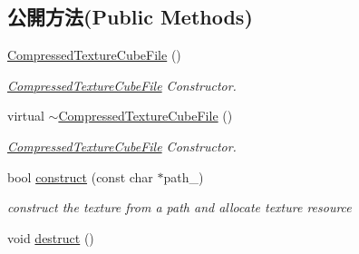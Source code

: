\subsection*{公開方法(Public Methods)}
\begin{DoxyCompactItemize}
\item 
\hyperlink{class_i_dream_sky_1_1_compressed_texture_cube_file_aefa8787aee90468e901fe19a87ae568f}{Compressed\+Texture\+Cube\+File} ()
\begin{DoxyCompactList}\small\item\em \hyperlink{class_i_dream_sky_1_1_compressed_texture_cube_file}{Compressed\+Texture\+Cube\+File} Constructor. \end{DoxyCompactList}\item 
virtual \hyperlink{class_i_dream_sky_1_1_compressed_texture_cube_file_a3a4c657cbe39dd8b641bd37f7d6df86e}{$\sim$\+Compressed\+Texture\+Cube\+File} ()
\begin{DoxyCompactList}\small\item\em \hyperlink{class_i_dream_sky_1_1_compressed_texture_cube_file}{Compressed\+Texture\+Cube\+File} Constructor. \end{DoxyCompactList}\item 
bool \hyperlink{class_i_dream_sky_1_1_compressed_texture_cube_file_a7c10dd1f90a4f8d057c0a194ef62cabe}{construct} (const char $\ast$path\+\_\+)
\begin{DoxyCompactList}\small\item\em construct the texture from a path and allocate texture resource \end{DoxyCompactList}\item 
void \hyperlink{class_i_dream_sky_1_1_compressed_texture_cube_file_a7a3f8f23e09fd0f8e05f2c9869db1853}{destruct} ()\hypertarget{class_i_dream_sky_1_1_compressed_texture_cube_file_a7a3f8f23e09fd0f8e05f2c9869db1853}{}\label{class_i_dream_sky_1_1_compressed_texture_cube_file_a7a3f8f23e09fd0f8e05f2c9869db1853}


\end{DoxyCompactItemize}
